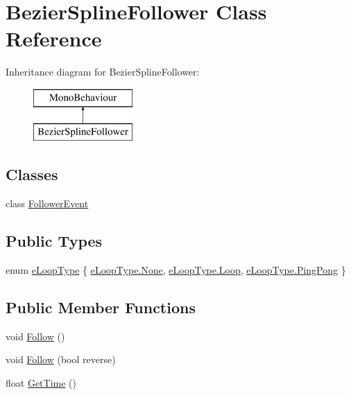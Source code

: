 \hypertarget{class_bezier_spline_follower}{}\section{Bezier\+Spline\+Follower Class Reference}
\label{class_bezier_spline_follower}
Inheritance diagram for Bezier\+Spline\+Follower\+:\begin{figure}[H]
\begin{center}
\leavevmode
\includegraphics[height=2.000000cm]{class_bezier_spline_follower}
\end{center}
\end{figure}
\subsection*{Classes}
\begin{DoxyCompactItemize}
\item 
class \mbox{\hyperlink{class_bezier_spline_follower_1_1_follower_event}{Follower\+Event}}
\end{DoxyCompactItemize}
\subsection*{Public Types}
\begin{DoxyCompactItemize}
\item 
enum \mbox{\hyperlink{class_bezier_spline_follower_a418bf6c27ad6a16dbd39b309bee6a602}{e\+Loop\+Type}} \{ \mbox{\hyperlink{class_bezier_spline_follower_a418bf6c27ad6a16dbd39b309bee6a602a6adf97f83acf6453d4a6a4b1070f3754}{e\+Loop\+Type.\+None}}, 
\mbox{\hyperlink{class_bezier_spline_follower_a418bf6c27ad6a16dbd39b309bee6a602a89d7b10cb4238977d2b523dfd9ea7745}{e\+Loop\+Type.\+Loop}}, 
\mbox{\hyperlink{class_bezier_spline_follower_a418bf6c27ad6a16dbd39b309bee6a602a99e52704462d3580db3528cad7ea9660}{e\+Loop\+Type.\+Ping\+Pong}}
 \}
\end{DoxyCompactItemize}
\subsection*{Public Member Functions}
\begin{DoxyCompactItemize}
\item 
void \mbox{\hyperlink{class_bezier_spline_follower_a3619ed2ff2189fc411c3d9c67d4fa0ec}{Follow}} ()
\item 
void \mbox{\hyperlink{class_bezier_spline_follower_a54b7a38ffdce65e5e38c18774a558ef2}{Follow}} (bool reverse)
\item 
float \mbox{\hyperlink{class_bezier_spline_follower_ad7f72b44b84a3572bdee23536aef8004}{Get\+Time}} ()
\end{DoxyCompactItemize}
